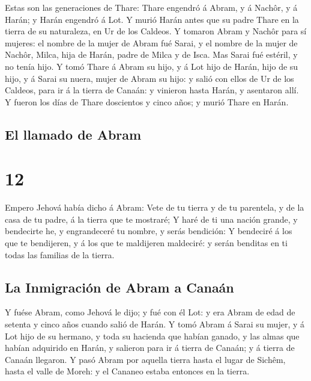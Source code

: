  Estas son las generaciones de Thare: Thare engendró á
Abram, y á Nachôr, y á Harán; y Harán engendró á Lot.  Y
murió Harán antes que su padre Thare en la tierra de su naturaleza, en
Ur de los Caldeos.  Y tomaron Abram y Nachôr para sí
mujeres: el nombre de la mujer de Abram fué Sarai, y el nombre de la
mujer de Nachôr, Milca, hija de Harán, padre de Milca y de Isca.
 Mas Sarai fué estéril, y no tenía hijo. 
Y tomó Thare á Abram su hijo, y á Lot hijo de Harán, hijo de su hijo, y
á Sarai su nuera, mujer de Abram su hijo: y salió con ellos de Ur de los
Caldeos, para ir á la tierra de Canaán: y vinieron hasta Harán, y
asentaron allí.  Y fueron los días de Thare doscientos y
cinco años; y murió Thare en Harán.

\hypertarget{el-llamado-de-abram}{%
\subsection{El llamado de Abram}\label{el-llamado-de-abram}}

\hypertarget{section-01-12}{%
\section{12}\label{section-01-12}}

 Empero Jehová había dicho á Abram: Vete de tu tierra y de
tu parentela, y de la casa de tu padre, á la tierra que te mostraré;
 Y haré de ti una nación grande, y bendecirte he, y
engrandeceré tu nombre, y serás bendición:  Y bendeciré á
los que te bendijeren, y á los que te maldijeren maldeciré: y serán
benditas en ti todas las familias de la tierra.

\hypertarget{la-inmigraciuxf3n-de-abram-a-canauxe1n}{%
\subsection{La Inmigración de Abram a
Canaán}\label{la-inmigraciuxf3n-de-abram-a-canauxe1n}}

 Y fuése Abram, como Jehová le dijo; y fué con él Lot: y
era Abram de edad de setenta y cinco años cuando salió de Harán.
 Y tomó Abram á Sarai su mujer, y á Lot hijo de su
hermano, y toda su hacienda que habían ganado, y las almas que habían
adquirido en Harán, y salieron para ir á tierra de Canaán; y á tierra de
Canaán llegaron.  Y pasó Abram por aquella tierra hasta el
lugar de Sichêm, hasta el valle de Moreh: y el Cananeo estaba entonces
en la tierra.

